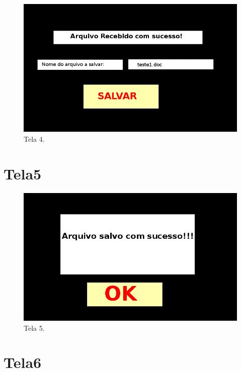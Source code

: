 \documentclass[11pt,a4paper]{article}
\begin{document}
\begin{figure}[H]
  \centering
  \hspace*{-1.5cm}
  \includegraphics[scale=0.7]{Tela4.png}
  \caption{Tela 4.}
  \label{Tela4}
\end{figure}

\section{Tela5}

\begin{figure}[H]
  \centering
  \hspace*{-1.5cm}
  \includegraphics[scale=0.7]{Tela5.png}
  \caption{Tela 5.}
  \label{Tela5}
\end{figure}

\section{Tela6}
\end{document}
